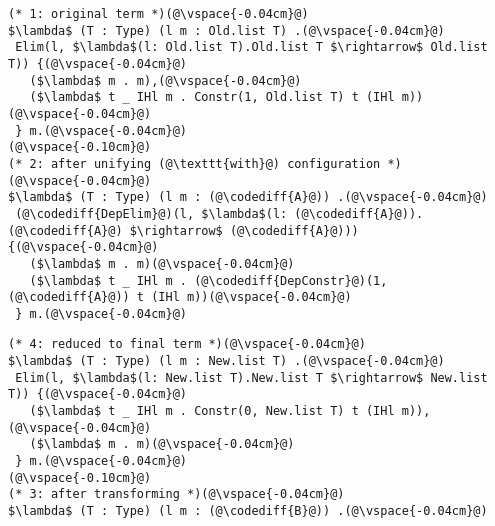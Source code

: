 \begin{figure*}
\begin{minipage}{0.49\textwidth}
\begin{lstlisting}
(* 1: original term *)(@\vspace{-0.04cm}@)
$\lambda$ (T : Type) (l m : Old.list T) .(@\vspace{-0.04cm}@)
 Elim(l, $\lambda$(l: Old.list T).Old.list T $\rightarrow$ Old.list T)) {(@\vspace{-0.04cm}@)
   ($\lambda$ m . m),(@\vspace{-0.04cm}@)
   ($\lambda$ t _ IHl m . Constr(1, Old.list T) t (IHl m))(@\vspace{-0.04cm}@)
 } m.(@\vspace{-0.04cm}@)
(@\vspace{-0.10cm}@)
(* 2: after unifying (@\texttt{with}@) configuration *)(@\vspace{-0.04cm}@)
$\lambda$ (T : Type) (l m : (@\codediff{A}@)) .(@\vspace{-0.04cm}@)
 (@\codediff{DepElim}@)(l, $\lambda$(l: (@\codediff{A}@)).(@\codediff{A}@) $\rightarrow$ (@\codediff{A}@))) {(@\vspace{-0.04cm}@)
   ($\lambda$ m . m)(@\vspace{-0.04cm}@)
   ($\lambda$ t _ IHl m . (@\codediff{DepConstr}@)(1, (@\codediff{A}@)) t (IHl m))(@\vspace{-0.04cm}@)
 } m.(@\vspace{-0.04cm}@)
\end{lstlisting}
\end{minipage}
\hfill
\begin{minipage}{0.49\textwidth}
\begin{lstlisting}
(* 4: reduced to final term *)(@\vspace{-0.04cm}@)
$\lambda$ (T : Type) (l m : New.list T) .(@\vspace{-0.04cm}@)
 Elim(l, $\lambda$(l: New.list T).New.list T $\rightarrow$ New.list T)) {(@\vspace{-0.04cm}@)
   ($\lambda$ t _ IHl m . Constr(0, New.list T) t (IHl m)),(@\vspace{-0.04cm}@)
   ($\lambda$ m . m)(@\vspace{-0.04cm}@)
 } m.(@\vspace{-0.04cm}@)
(@\vspace{-0.10cm}@)
(* 3: after transforming *)(@\vspace{-0.04cm}@)
$\lambda$ (T : Type) (l m : (@\codediff{B}@)) .(@\vspace{-0.04cm}@)

\end{lstlisting}
\end{minipage}
\end{figure*}

